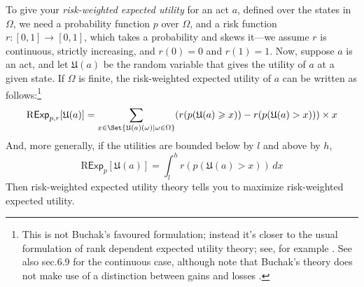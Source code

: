 \documentclass[a4paper]{article}
\newcommand\Exp{\mathsf{Exp}}
\newcommand\RExp{\mathrm{R}\Exp} %
\newcommand\U{\mathfrak{U}} %
\newcommand{\todoold}[2][]{\todo[backgroundcolor=white,bordercolor=orange!10,linecolor=gray!10, #1,caption={},textcolor=gray]{Pre-rev: #2}}
\newcommand\SetDelimiter[1][]{
	\nonscript\,#1\vert \allowbreak \nonscript\,\mathopen{}}
\providecommand\given{\SetDelimiter}
\renewcommand{\geq}{\geqslant}
\newenvironment{CCM rewritten}
{\begingroup\color{blue}} %
{\endgroup}              %
\begin{document}
To give your \emph{risk-weighted expected utility} for an act $a$, defined over the states in $\Omega$, we need a probability function $p$ over $\Omega$, and a risk function $r : [0, 1] \rightarrow [0, 1]$, which takes a probability and skews it---we assume $r$ is continuous, strictly increasing, and $r(0)= 0$ and $r(1) = 1$. Now, suppose $a$ is an act, and let $\U(a)$ be the random variable that gives the utility of $a$ at a given state. 
If $\Omega$ is finite, the risk-weighted expected utility of $a$ can be written as follows:\footnote{This is not Buchak's favoured formulation; instead it's closer to the usual formulation of rank dependent expected utility theory; see, for example \citep[ch.6]{wakker2010prospect}.  See also sec.6.9 for the continuous case, although note that Buchak's theory does not make use of a distinction between gains and losses \citep[see][p59]{buchak2014rr}. }%
$$
\RExp_{p, r}[\U(a)] = \sum_{x \in \Set{\U(a)(\omega)\given \omega \in \Omega}} (r(p(\U(a) \geq x)) - r(p(\U(a) > x)))\times x
$$
And, more generally, if the utilities are bounded below by $l$ and above by $h$,
$$
\RExp_p[\U(a)] = \int^h_{l} r(p(\U(a) > x))\, dx
$$
Then risk-weighted expected utility theory tells you to maximize risk-weighted expected utility.


\end{document}
